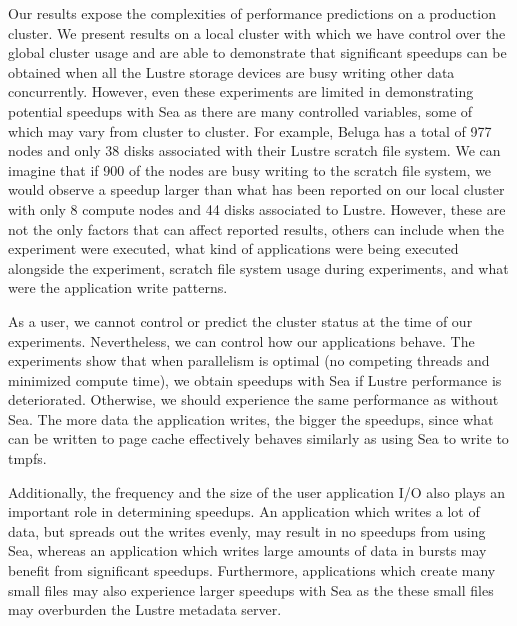     Our results expose the complexities of performance predictions on a
    production cluster. We present results on a local cluster with which we have
    control over the global cluster usage and are able to demonstrate that
    significant speedups can be obtained when all the Lustre storage devices
    are busy writing other data concurrently. However, even these experiments
    are limited in demonstrating potential speedups with Sea as there are many
    controlled variables, some of which may vary from cluster to cluster. For
    example, Beluga has a total of 977 nodes and only 38 disks associated with
    their Lustre scratch file system. We can imagine that if 900 of the nodes
    are busy writing to the scratch file system, we would observe a speedup
    larger than what has been reported on our local cluster with only 8 compute
    nodes and 44 disks associated to Lustre. However, these are not the only
    factors that can affect reported results, others can include when the
    experiment were executed, what kind of applications were being executed
    alongside the experiment, scratch file system usage during experiments, and what
    were the application write patterns.

    As a user, we cannot control or predict the cluster status at the time of
    our experiments. Nevertheless, we can control how our applications behave. The
    experiments show that when parallelism is optimal (no competing threads and
    minimized compute time), we obtain speedups with Sea if Lustre performance
    is deteriorated. Otherwise, we should experience the same performance as 
    without Sea. The more data the application writes, the bigger the speedups, since what
    can be written to page cache effectively behaves similarly as using Sea to write
    to tmpfs.
    
    Additionally, the frequency and the size of the user application I/O also
    plays an important role in determining speedups. An application which writes
    a lot of data, but spreads out the writes evenly, may result in no
    speedups from using Sea, whereas an application which writes large amounts
    of data in bursts may benefit from significant speedups. Furthermore,
    applications which create many small files may also experience larger
    speedups with Sea as the these small files may overburden the Lustre
    metadata server.

    
